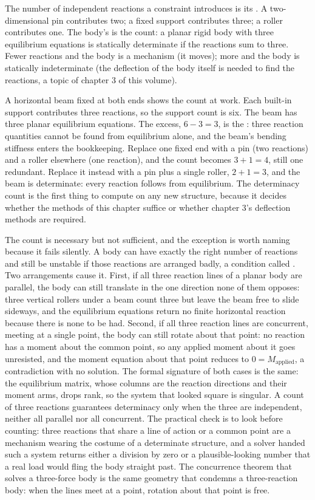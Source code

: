 The number of independent reactions a constraint introduces is its
. A two-dimensional pin contributes two; a fixed
support contributes three; a roller contributes one. The body's
 is the count: a planar rigid body with
three equilibrium equations is statically determinate if the
reactions sum to three. Fewer reactions and the body is a mechanism
(it moves); more and the body is statically indeterminate (the
deflection of the body itself is needed to find the reactions, a
topic of chapter 3 of this volume).

A horizontal beam fixed at both ends shows the count at work. Each
built-in support contributes three reactions, so the support count is
six. The beam has three planar equilibrium equations. The excess,
$6 - 3 = 3$, is the : three
reaction quantities cannot be found from equilibrium alone, and the
beam's bending stiffness enters the bookkeeping. Replace one fixed end
with a pin (two reactions) and a roller elsewhere (one reaction), and
the count becomes $3 + 1 = 4$, still one redundant. Replace it instead
with a pin plus a single roller, $2 + 1 = 3$, and the beam is
determinate: every reaction follows from equilibrium. The determinacy
count is the first thing to compute on any new structure, because it
decides whether the methods of this chapter suffice or whether
chapter 3's deflection methods are required.

The count is necessary but not sufficient, and the exception is worth naming
because it fails silently. A body can have exactly the right number of
reactions and still be unstable if those reactions are arranged badly, a
condition called . Two arrangements cause it.
First, if all three reaction lines of a planar body are parallel, the body can
still translate in the one direction none of them opposes: three vertical
rollers under a beam count three but leave the beam free to slide sideways, and
the equilibrium equations return no finite horizontal reaction because there is
none to be had. Second, if all three reaction lines are concurrent, meeting at
a single point, the body can still rotate about that point: no reaction has a
moment about the common point, so any applied moment about it goes unresisted,
and the moment equation about that point reduces to $0 = M_{\text{applied}}$, a
contradiction with no solution. The formal signature of both cases is the same:
the equilibrium matrix, whose columns are the reaction directions and their
moment arms, drops rank, so the system that looked square is singular. A count
of three reactions guarantees determinacy only when the three are independent,
neither all parallel nor all concurrent. The practical check is to look before
counting: three reactions that share a line of action or a common point are a
mechanism wearing the costume of a determinate structure, and a solver handed
such a system returns either a division by zero or a plausible-looking number
that a real load would fling the body straight past. The concurrence theorem
that solves a three-force body is the same geometry that condemns a
three-reaction body: when the lines meet at a point, rotation about that point
is free.

